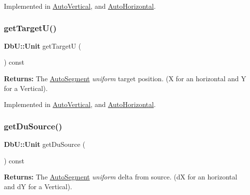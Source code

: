 Implemented in \mbox{\hyperlink{classKatabatic_1_1AutoVertical_ad521ffba761b0e81b7b81b99d62f76f9}{Auto\+Vertical}}, and \mbox{\hyperlink{classKatabatic_1_1AutoHorizontal_ad521ffba761b0e81b7b81b99d62f76f9}{Auto\+Horizontal}}.

\mbox{\label{classKatabatic_1_1AutoSegment_a828fef2716cc9c370d6d170bb96556ec}} 
\subsubsection{\texorpdfstring{get\+Target\+U()}{getTargetU()}}
{\footnotesize\ttfamily \textbf{ Db\+U\+::\+Unit} get\+TargetU (\begin{DoxyParamCaption}{ }\end{DoxyParamCaption}) const\hspace{0.3cm}{\ttfamily [pure virtual]}}

{\bfseries Returns\+:} The \mbox{\hyperlink{classKatabatic_1_1AutoSegment}{Auto\+Segment}} {\itshape uniform} target position. (X for an horizontal and Y for a Vertical). 

Implemented in \mbox{\hyperlink{classKatabatic_1_1AutoVertical_a4d52a506cd19dfa8e22e1dc0695bd960}{Auto\+Vertical}}, and \mbox{\hyperlink{classKatabatic_1_1AutoHorizontal_a4d52a506cd19dfa8e22e1dc0695bd960}{Auto\+Horizontal}}.

\mbox{\label{classKatabatic_1_1AutoSegment_ab4881df67bd8f036d0199ed6540fe774}} 
\subsubsection{\texorpdfstring{get\+Du\+Source()}{getDuSource()}}
{\footnotesize\ttfamily \textbf{ Db\+U\+::\+Unit} get\+Du\+Source (\begin{DoxyParamCaption}{ }\end{DoxyParamCaption}) const\hspace{0.3cm}{\ttfamily [pure virtual]}}

{\bfseries Returns\+:} The \mbox{\hyperlink{classKatabatic_1_1AutoSegment}{Auto\+Segment}} {\itshape uniform} delta from source. (dX for an horizontal and dY for a Vertical). 

